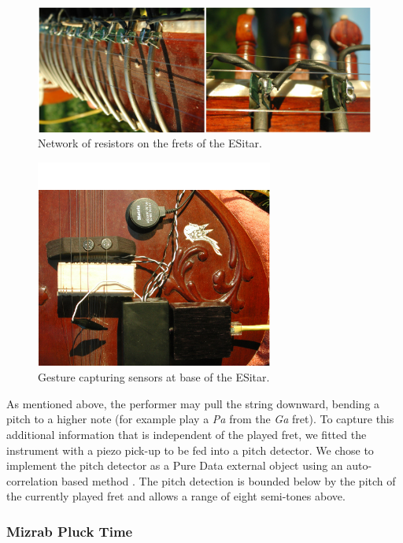 \begin{figure}[t]
\centering
\includegraphics[width=\textwidth]{img-11-eps-converted-to-crop.pdf}      
\caption{Network of resistors on the frets of the ESitar.}
\label{Kapur:img-11}       %
\end{figure}

\begin{figure}[t]
\centering
\includegraphics[width=78mm]{img-1-eps-converted-to-crop.pdf}      
\caption{Gesture capturing sensors at base of the ESitar.}
\label{Kapur:img-1}       %
\end{figure}


As mentioned above, the performer may
pull the string downward, bending a pitch to a higher note (for example play a
\textit{Pa }from the \textit{Ga} fret). To capture this additional information
that is independent of the played fret, we fitted the instrument with a piezo
pick-up to be fed into a pitch detector.  We chose to implement the pitch
detector as a Pure Data \cite{Puckette:1996a} external object using an auto-correlation
based method \cite{Zolzer:2002}.  The pitch detection is bounded below by the pitch of the currently played fret and allows a range of eight semi-tones above.

\subsubsection{Mizrab Pluck Time}

